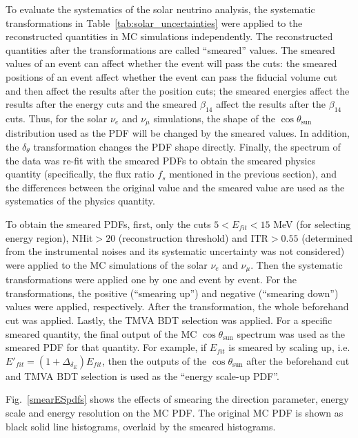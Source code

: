 To evaluate the systematics of the solar neutrino analysis, the systematic transformations in Table~\ref{tab:solar_uncertainties} were applied to the reconstructed quantities in MC simulations independently. The reconstructed quantities after the transformations are called ``smeared'' values. The smeared values of an event can affect whether the event will pass the cuts: the smeared positions of an event affect whether the event can pass the fiducial volume cut and then affect the results after the position cuts; the smeared energies affect the results after the energy cuts and the smeared $\beta_{14}$ affect the results after the $\beta_{14}$ cuts. Thus, for the solar $\nu_e$ and $\nu_\mu$ simulations, the shape of the $\cos\theta_\mathrm{sun}$ distribution used as the PDF will be changed by the smeared values. In addition, the $\delta_\theta$ transformation changes the PDF shape directly. Finally, the spectrum of the data was re-fit with the smeared PDFs to obtain the smeared physics quantity (specifically, the flux ratio $f_s$ mentioned in the previous section), and the differences between the original value and the smeared value are used as the systematics of the physics quantity.

To obtain the smeared PDFs, first, only the cuts $5<E_{fit}<15$ MeV (for selecting energy region), NHit$>20$ (reconstruction threshold) and $\mathrm{ITR}>0.55$ (determined from the instrumental noises and its systematic uncertainty was not considered) were applied to the MC simulations of the solar $\nu_e$ and $\nu_\mu$. Then the systematic transformations were applied one by one and event by event. For the transformations, the positive (``smearing up'') and negative (``smearing down'') values were applied, respectively. After the transformation, the whole beforehand cut was applied. Lastly, the TMVA BDT selection was applied. For a specific smeared quantity, the final output of the MC $\cos\theta_\mathrm{sun}$ spectrum was used as the smeared PDF for that quantity. For example, if $E_{fit}$ is smeared by scaling up, i.e. $E'_{fit}=(1+\Delta_{\delta_E})E_{fit}$, then the outputs of the $\cos\theta_\mathrm{sun}$ after the beforehand cut and TMVA BDT selection is used as the ``energy scale-up PDF''.

Fig.~\ref{smearESpdfs} shows the effects of smearing the direction parameter, energy scale and energy resolution on the MC PDF. The original MC PDF is shown as black solid line histograms, overlaid by the smeared histograms.

